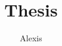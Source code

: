 \documentclass[11pt,a4paper,openany]{book}
\title{Thesis}
\author{Alexis}
\date{}
\begin{document}
\maketitle{}
\mainmatter

\tableofcontents{}


\end{document}
